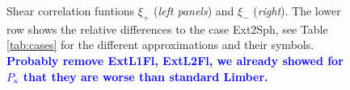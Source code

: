 \documentclass[fleqn,usenatbib]{mnras} %
\newcommand{\mk}[1]{{\bf\textcolor{blue}{#1}}}
\begin{document}
\begin{figure}
\begin{center}
  \end{center}

  \caption{Shear correlation funtions $\xi_+$ (\emph{left panels}) and $\xi_-$ (\emph{right}).
    The lower row shows the relative differences to the case Ext2Sph,  see Table \ref{tab:cases} for the different
    approximations and their symbols.
    \mk{Probably remove ExtL1Fl, ExtL2Fl, we already showed for $P_\kappa$ that they are worse than standard
    Limber.}
  }

  \label{fig:xi_pm_K16}

\end{figure}
\end{document}
